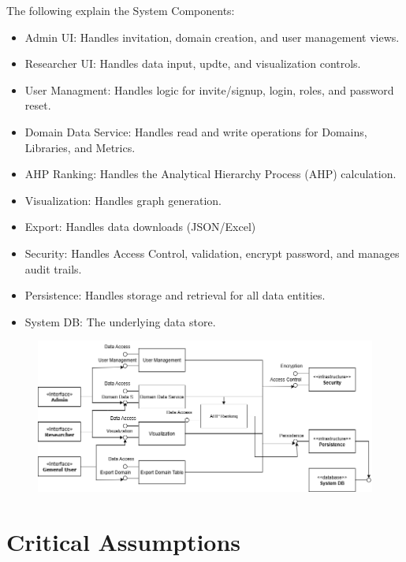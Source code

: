 \documentclass{article}
\begin{document}
The following explain the System Components:
\begin{itemize}
    \item Admin UI: Handles invitation, domain creation, and user management views.
    \item Researcher UI: Handles data input, updte, and visualization controls.
    \item User Managment: Handles logic for invite/signup, login, roles, and password reset.
    \item Domain Data Service: Handles read and write operations for Domains, Libraries, and Metrics.
    \item AHP Ranking: Handles the Analytical Hierarchy Process (AHP) calculation.
    \item Visualization: Handles graph generation.
    \item Export: Handles data downloads (JSON/Excel)
    \item Security: Handles Access Control, validation, encrypt password, and manages audit trails.
    \item Persistence: Handles storage and retrieval for all data entities.
    \item System DB: The underlying data store.
\end{itemize}

\begin{figure}[H]
    \centering
    \includegraphics[scale=0.5] {component.png}
\end{figure}

\section{Critical Assumptions}

\end{document}

